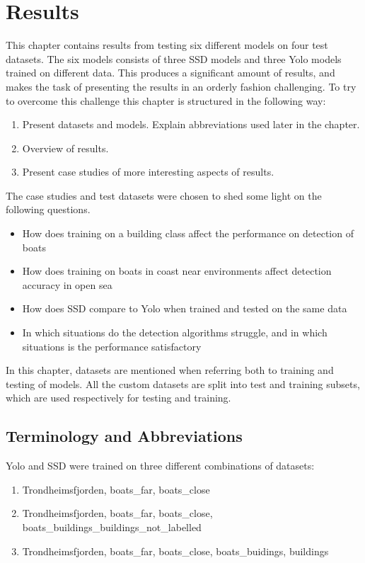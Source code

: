 \chapter{Results}
\label{sec:results}

This chapter contains results from testing six different models on four test datasets. The six models consists of three SSD models and three Yolo models trained on different data. This produces a significant amount of results, and makes the task of presenting the results in an orderly fashion challenging. To try to overcome this challenge this chapter is structured in the following way:

\begin{enumerate}
    \item Present datasets and models. Explain abbreviations used later in the chapter.
    \item Overview of results.
    \item Present case studies of more interesting aspects of results.
\end{enumerate}

\noindent
The case studies  and test datasets were chosen to shed some light on the following questions.

\begin{itemize}
    \item How does training on a building class affect the performance on detection of boats
    \item How does training on boats in coast near environments affect detection accuracy in open sea
    \item How does SSD compare to Yolo when trained and tested on the same data
    \item In which situations do the detection algorithms struggle, and in which situations is the performance satisfactory
\end{itemize}

In this chapter, datasets are mentioned when referring both to training and testing of models. All the custom datasets are split into test and training subsets, which are used respectively for testing and training.

\section{Terminology and Abbreviations}
Yolo and SSD were trained on three different combinations of datasets:


\begin{enumerate}
    \item Trondheimsfjorden, boats\_far, boats\_close
    \item Trondheimsfjorden, boats\_far, boats\_close, boats\_buildings\_buildings\_not\_labelled
    \item Trondheimsfjorden, boats\_far, boats\_close, boats\_buidings, buildings
\end{enumerate}

